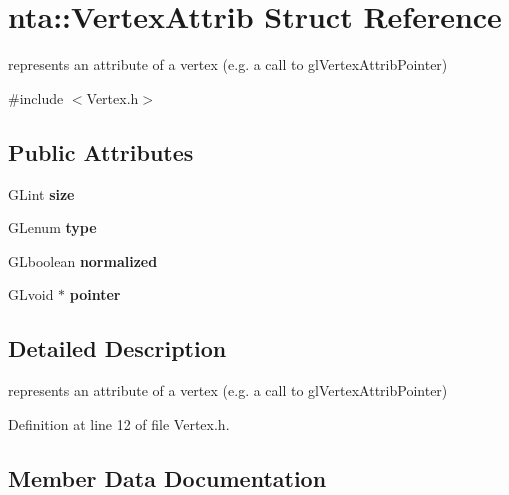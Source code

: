 \hypertarget{structnta_1_1VertexAttrib}{}\section{nta\+:\+:Vertex\+Attrib Struct Reference}
\label{structnta_1_1VertexAttrib}


represents an attribute of a vertex (e.\+g. a call to gl\+Vertex\+Attrib\+Pointer)  




{\ttfamily \#include $<$Vertex.\+h$>$}

\subsection*{Public Attributes}
\begin{DoxyCompactItemize}
\item 
\mbox{\label{structnta_1_1VertexAttrib_afd253a525c4d086bcc2afa66a2d0118e}} 
G\+Lint {\bfseries size}
\item 
\mbox{\label{structnta_1_1VertexAttrib_a625cbe8f28739965a9ec29b9a426465e}} 
G\+Lenum {\bfseries type}
\item 
\mbox{\label{structnta_1_1VertexAttrib_afe78648a02032d5ba376207cf322320a}} 
G\+Lboolean {\bfseries normalized}
\item 
\mbox{\label{structnta_1_1VertexAttrib_a926cbe1d958dd6e72ad7f93e8791d9a4}} 
G\+Lvoid $\ast$ {\bfseries pointer}
\end{DoxyCompactItemize}


\subsection{Detailed Description}
represents an attribute of a vertex (e.\+g. a call to gl\+Vertex\+Attrib\+Pointer) 

Definition at line 12 of file Vertex.\+h.



\subsection{Member Data Documentation}
\mbox{\label{structnta_1_1VertexAttrib_afe78648a02032d5ba376207cf322320a}} 
